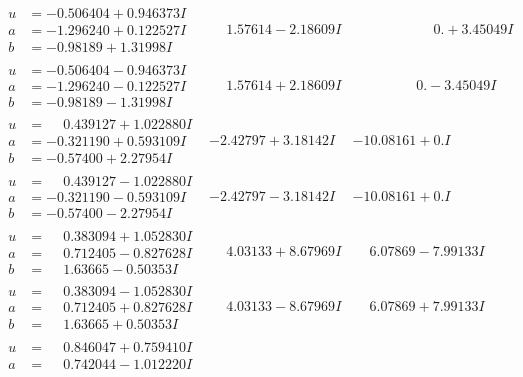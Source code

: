 \documentclass[1p]{elsarticle_modified}
\theoremstyle{definition}
\begin{document}
$$\begin{array}{c|c|c}
\begin{aligned}
u &= -0.506404 + 0.946373 I \\
a &= -1.296240 + 0.122527 I \\
b &= -0.98189 + 1.31998 I\end{aligned}
 & \phantom{-}1.57614 - 2.18609 I & \phantom{-0.000000 -}0. + 3.45049 I \\ \hline\begin{aligned}
u &= -0.506404 - 0.946373 I \\
a &= -1.296240 - 0.122527 I \\
b &= -0.98189 - 1.31998 I\end{aligned}
 & \phantom{-}1.57614 + 2.18609 I & \phantom{-0.000000 } 0. - 3.45049 I \\ \hline\begin{aligned}
u &= \phantom{-}0.439127 + 1.022880 I \\
a &= -0.321190 + 0.593109 I \\
b &= -0.57400 + 2.27954 I\end{aligned}
 & -2.42797 + 3.18142 I & -10.08161 + 0. I\phantom{ +0.000000I} \\ \hline\begin{aligned}
u &= \phantom{-}0.439127 - 1.022880 I \\
a &= -0.321190 - 0.593109 I \\
b &= -0.57400 - 2.27954 I\end{aligned}
 & -2.42797 - 3.18142 I & -10.08161 + 0. I\phantom{ +0.000000I} \\ \hline\begin{aligned}
u &= \phantom{-}0.383094 + 1.052830 I \\
a &= \phantom{-}0.712405 - 0.827628 I \\
b &= \phantom{-}1.63665 - 0.50353 I\end{aligned}
 & \phantom{-}4.03133 + 8.67969 I & \phantom{-}6.07869 - 7.99133 I \\ \hline\begin{aligned}
u &= \phantom{-}0.383094 - 1.052830 I \\
a &= \phantom{-}0.712405 + 0.827628 I \\
b &= \phantom{-}1.63665 + 0.50353 I\end{aligned}
 & \phantom{-}4.03133 - 8.67969 I & \phantom{-}6.07869 + 7.99133 I \\ \hline\begin{aligned}
u &= \phantom{-}0.846047 + 0.759410 I \\
a &= \phantom{-}0.742044 - 1.012220 I \\

\end{aligned}
\end{array}$$
\end{document}
